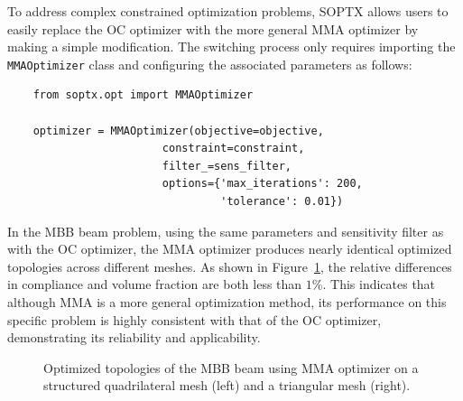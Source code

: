\documentclass[mathpazo]{cicp}
\begin{document}
To address complex constrained optimization problems, SOPTX allows users to easily replace the OC optimizer with the more general MMA optimizer by making a simple modification. The switching process only requires importing the \texttt{MMAOptimizer} class and configuring the associated parameters as follows:
\begin{lstlisting}
	from soptx.opt import MMAOptimizer
	
	optimizer = MMAOptimizer(objective=objective,
						constraint=constraint,
						filter_=sens_filter,
						options={'max_iterations': 200, 
								 'tolerance': 0.01})
\end{lstlisting}

In the MBB beam problem, using the same parameters and sensitivity filter as with the OC optimizer, the MMA optimizer produces nearly identical optimized topologies across different meshes. As shown in Figure~\ref{fig:mbb_mma_all}, the relative differences in compliance and volume fraction are both less than $1\%$.  This indicates that although MMA is a more general optimization method, its performance on this specific problem is highly consistent with that of the OC optimizer, demonstrating its reliability and applicability.
\begin{figure}[htp]
	\centering
	\caption{Optimized topologies of the MBB beam using MMA optimizer on a structured quadrilateral mesh (left) and a triangular mesh (right).}
	\label{fig:mbb_mma_all}
\end{figure}
\end{document}

